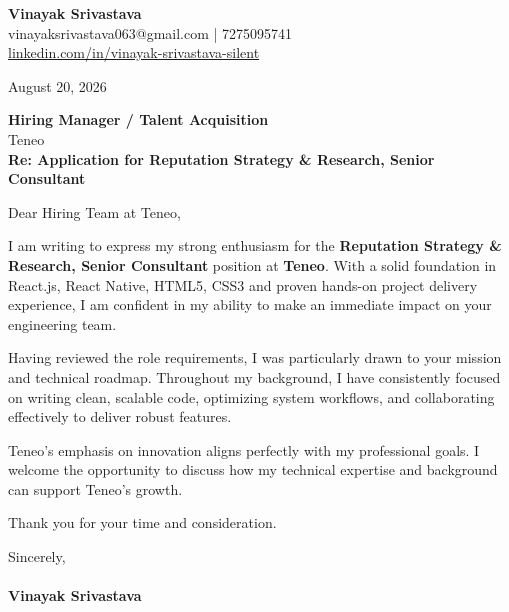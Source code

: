 \documentclass[11pt,a4paper]{article}
\begin{document}
\thispagestyle{empty}

{\Large \textbf{Vinayak Srivastava}}\\
vinayaksrivastava063@gmail.com | 7275095741 \\
\url{linkedin.com/in/vinayak-srivastava-silent}

\vspace{1em}
\hfill August 20, 2026

\textbf{Hiring Manager / Talent Acquisition}\\
Teneo\\

\vspace{1.5em}
\textbf{Re: Application for Reputation Strategy & Research, Senior Consultant}

\vspace{1em}
Dear Hiring Team at Teneo,

I am writing to express my strong enthusiasm for the \textbf{Reputation Strategy & Research, Senior Consultant} position at \textbf{Teneo}. With a solid foundation in React.js, React Native, HTML5, CSS3 and proven hands-on project delivery experience, I am confident in my ability to make an immediate impact on your engineering team.

Having reviewed the role requirements, I was particularly drawn to your mission and technical roadmap. Throughout my background, I have consistently focused on writing clean, scalable code, optimizing system workflows, and collaborating effectively to deliver robust features.

Teneo's emphasis on innovation aligns perfectly with my professional goals. I welcome the opportunity to discuss how my technical expertise and background can support Teneo's growth.

Thank you for your time and consideration.

\vspace{1.5em}
Sincerely,\\
\vspace{1em}\\
\textbf{Vinayak Srivastava}
\end{document}
